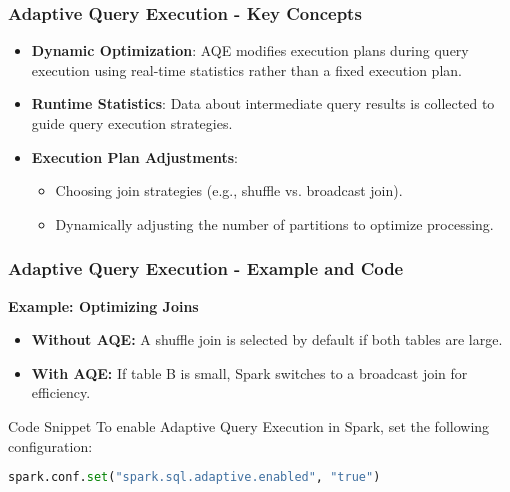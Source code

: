 \documentclass[aspectratio=169]{beamer}
\begin{document}
\begin{frame}[fragile]
    \frametitle{Adaptive Query Execution - Key Concepts}
    \begin{itemize}
        \item \textbf{Dynamic Optimization}: AQE modifies execution plans during query execution using real-time statistics rather than a fixed execution plan.
        \item \textbf{Runtime Statistics}: Data about intermediate query results is collected to guide query execution strategies.
        \item \textbf{Execution Plan Adjustments}:
        \begin{itemize}
            \item Choosing join strategies (e.g., shuffle vs. broadcast join).
            \item Dynamically adjusting the number of partitions to optimize processing.
        \end{itemize}
    \end{itemize}
\end{frame}

\begin{frame}[fragile]
    \frametitle{Adaptive Query Execution - Example and Code}
    \textbf{Example: Optimizing Joins}
    \begin{itemize}
        \item \textbf{Without AQE:} A shuffle join is selected by default if both tables are large.
        \item \textbf{With AQE:} If table B is small, Spark switches to a broadcast join for efficiency.
    \end{itemize} 

    \begin{block}{Code Snippet}
        To enable Adaptive Query Execution in Spark, set the following configuration:
        \begin{lstlisting}[language=Python]
spark.conf.set("spark.sql.adaptive.enabled", "true")
        \end{lstlisting}
    \end{block}
\end{frame}
\end{document}

